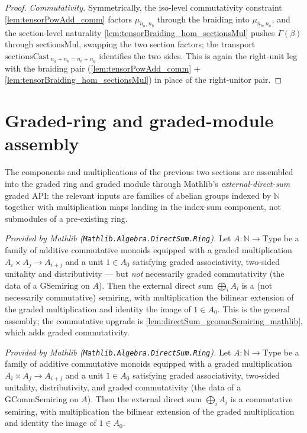 \begin{proof}
  \emph{Commutativity.} Symmetrically, the iso-level commutativity constraint
  \cref{lem:tensorPowAdd_comm} factors \(\mu_{n_a,n_b}\) through the braiding into
  \(\mu_{n_b,n_a}\), and the section-level naturality
  \cref{lem:tensorBraiding_hom_sectionsMul} pushes \(\Gamma(\beta)\) through
  \(\mathrm{sectionsMul}\), swapping the two section factors; the transport
  \(\mathrm{sectionsCast}_{\,n_a+n_b = n_b+n_a}\) identifies the two sides. This is
  again the right-unit leg with the braiding pair (\cref{lem:tensorPowAdd_comm} +
  \cref{lem:tensorBraiding_hom_sectionsMul}) in place of the right-unitor pair.
\end{proof}

\section{Graded-ring and graded-module assembly}
\label{sec:sgr_graded_assembly}

The components and multiplications of the previous two sections are assembled
into the graded ring and graded module through Mathlib's
\emph{external-direct-sum} graded API: the relevant inputs are families of
abelian groups indexed by \(\mathbb{N}\) together with multiplication maps
landing in the index-sum component, not submodules of a pre-existing ring.

\begin{lemma}
  \label{lem:directSum_gsemiring_mathlib}
  \mathlibok
  \textit{Provided by Mathlib (\texttt{Mathlib.Algebra.DirectSum.Ring}).}
  Let \(A : \mathbb{N} \to \mathrm{Type}\) be a family of additive commutative
  monoids equipped with a graded multiplication \(A_i \times A_j \to A_{i+j}\) and
  a unit \(1 \in A_0\) satisfying graded associativity, two-sided unitality and
  distributivity --- but \emph{not} necessarily graded commutativity (the data of
  a \(\mathrm{GSemiring}\) on \(A\)). Then the external direct sum
  \(\bigoplus_i A_i\) is a (not necessarily commutative) semiring, with
  multiplication the bilinear extension of the graded multiplication and identity
  the image of \(1 \in A_0\). This is the general assembly; the commutative
  upgrade is \cref{lem:directSum_gcommSemiring_mathlib}, which adds graded
  commutativity.
\end{lemma}

\begin{lemma}
  \label{lem:directSum_gcommSemiring_mathlib}
  \mathlibok
  \textit{Provided by Mathlib (\texttt{Mathlib.Algebra.DirectSum.Ring}).}
  Let \(A : \mathbb{N} \to \mathrm{Type}\) be a family of additive commutative
  monoids equipped with a graded multiplication
  \(A_i \times A_j \to A_{i+j}\) and a unit \(1 \in A_0\) satisfying graded
  associativity, two-sided unitality, distributivity, and graded commutativity
  (the data of a \(\mathrm{GCommSemiring}\) on \(A\)). Then the external direct
  sum \(\bigoplus_i A_i\) is a commutative semiring, with multiplication the
  bilinear extension of the graded multiplication and identity the image of
  \(1 \in A_0\).
\end{lemma}

